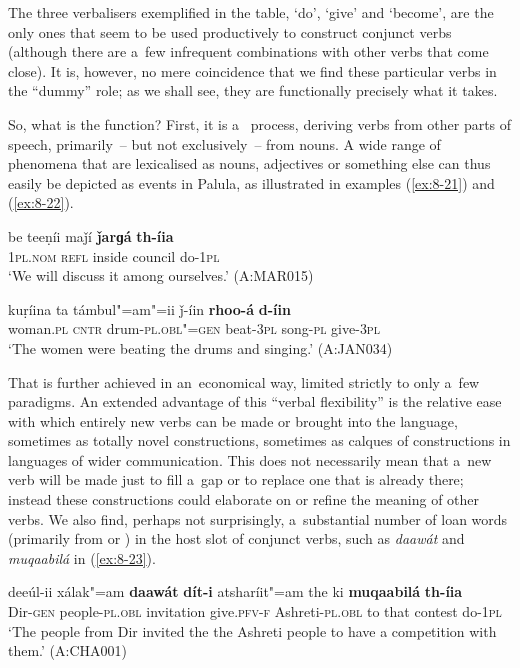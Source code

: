 The three verbalisers exemplified in the table, `do', `give' and `become', are the only ones that seem to be used productively to construct conjunct verbs (although there are a~few infrequent combinations with other verbs that come close). It is, however, no mere coincidence that we find these particular verbs in the ``dummy'' role; as we shall see, they are functionally precisely what it takes. 


So, what is the function? First, it is a~ process, deriving verbs from other parts of speech, primarily~-- but not exclusively~-- from nouns. A wide range of phenomena that are lexicalised as nouns, adjectives or something else can thus easily be depicted as events in Palula, as illustrated in examples (\ref{ex:8-21}) and (\ref{ex:8-22}). 

\begin{exe}
\ex
\label{ex:8-21}
\gll be teeṇíi maǰí \textbf{ǰarɡá} \textbf{th-íia} \\
\textsc{1}\textsc{pl.nom} \textsc{refl} inside council do-\textsc{1pl} \\
\glt `We will discuss it among ourselves.' (A:MAR015)
\end{exe}
\begin{exe}
\ex
\label{ex:8-22}
\gll kuṛíina ta támbul"=am"=ii ǰ-íin \textbf{rhoo-á} \textbf{d-íin} \\
woman.\textsc{pl} \textsc{cntr} drum-\textsc{pl.obl"=gen} beat-\textsc{3pl} song-\textsc{pl} give-\textsc{3pl}\\
\glt `The women were beating the drums and singing.' (A:JAN034)
\end{exe}

That is further achieved in an~economical way, limited strictly to only a~few  paradigms. An extended advantage of this ``verbal flexibility'' is the relative ease with which entirely new verbs can be made or brought into the language, sometimes as totally novel constructions, sometimes as calques of  constructions in languages of wider communication. This does not necessarily mean that a~new verb will be made just to fill a~gap or to replace one that is already there; instead these constructions could elaborate on or refine the meaning of other verbs. We also find, perhaps not surprisingly, a~substantial number of loan words (primarily from \iliUrdu or \iliPashto) in the host slot of conjunct verbs, such as \textit{daawát} and \textit{muqaabilá} in (\ref{ex:8-23}).

\ea
\label{ex:8-23}
\gll deeúl-ii xálak"=am \textbf{daawát} \textbf{dít-i} atsharíit"=am the ki \textbf{muqaabilá} \textbf{th-íia}\\
Dir-\textsc{gen} people-\textsc{pl.obl} invitation give.\textsc{pfv-f} Ashreti-\textsc{pl.obl} to that contest do-\textsc{1pl}\\
\glt `The people from Dir invited the the Ashreti people to have a competition with them.' (A:CHA001)
\z

